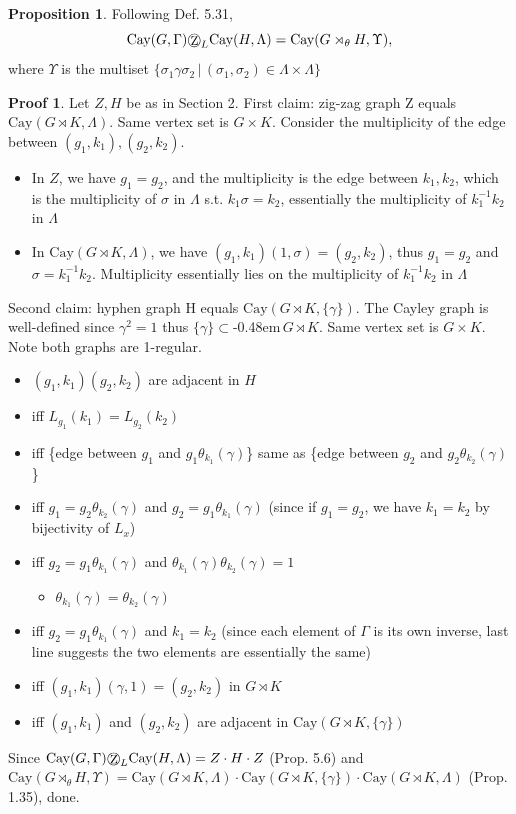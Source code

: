\documentclass{book}
\newcommand{\syin}{$\subset$\kern-0.48em\raisebox{.20ex}{\tiny S}$\,$}
\newcommand{\zigzag}{$\bigcirc$\kern-0.77em\raisebox{-.16ex}{\small Z}$\,$}
\newcommand{\Cay}[1]{\textrm{Cay}( #1 )}
\theoremstyle{definition}
\newtheorem{proposition}[lemma]{Proposition}
\theoremstyle{remarkstyle}
\newtheorem*{myproof}{Proof}%
\begin{document}
\begin{proposition}
Following Def. 5.31, 
    $$
    \Cay{G,\Gamma}\textrm{\zigzag}_L\Cay{H,\Lambda} = \Cay{G \rtimes_\theta H, \Upsilon}, 
    $$
    where $\Upsilon$ is the multiset $\{\sigma_1\gamma\sigma_2\,\lvert\,(\sigma_1,\sigma_2)\in \Lambda\times\Lambda\}$
\end{proposition}
\begin{myproof}
    Let $Z, H$ be as in Section 2. First claim: zig-zag graph Z equals $\Cay{G\rtimes K,\Lambda}$. Same vertex set is $G\times K$. Consider the multiplicity of the edge between $(g_1,k_1), (g_2,k_2)$. 
    \begin{itemize}
        \item In $Z$, we have $g_1=g_2$, and the multiplicity is the edge between $k_1,k_2$, which is the multiplicity of $\sigma$ in $\Lambda$ s.t. $k_1\sigma=k_2$, essentially the multiplicity of $k^{-1}_1k_2 $ in $\Lambda$
        \item In $\Cay{G\rtimes K,\Lambda}$, we have $(g_1,k_1)(1,\sigma)=(g_2,k_2)$, thus $g_1=g_2$ and $\sigma=k^{-1}_1k_2 $. Multiplicity essentially lies on the multiplicity of $k^{-1}_1k_2 $ in $\Lambda$
    \end{itemize}
    Second claim: hyphen graph H equals $\Cay{G\rtimes K, \{\gamma\}}$. The Cayley graph is well-defined since $\gamma^2=1$ thus $\{\gamma\}$\syin$G\rtimes K$. Same vertex set is $G\times K$. Note both graphs are 1-regular. 
    \begin{itemize}
        \item $(g_1,k_1)(g_2,k_2)$ are adjacent in $H$
        \item iff $L_{g_1}(k_1) = L_{g_2}(k_2) $
        \item iff \{edge between $g_1$ and $g_1\theta_{k_1}(\gamma)$\} same as \{edge between $g_2$ and $g_2\theta_{k_2}(\gamma)$\} 
        \item iff $g_1 = g_2\theta_{k_2}(\gamma) $ and $g_2 = g_1\theta_{k_1}(\gamma) $ (since if $g_1= g_2$, we have $k_1=k_2$ by bijectivity of $L_x$) 
        \item iff $g_2 = g_1\theta_{k_1}(\gamma) $ and $\theta_{k_1}(\gamma)\theta_{k_2}(\gamma)=1$
        \begin{itemize}
            \item $\theta_{k_1}(\gamma) = \theta_{k_2}(\gamma) $
        \end{itemize}
        \item iff $g_2 = g_1\theta_{k_1}(\gamma) $ and $k_1=k_2$ (since each element of $\Gamma$ is its own inverse, last line suggests the two elements are essentially the same)
        \item iff $(g_1,k_1)(\gamma,1)=(g_2,k_2)$ in $G\rtimes K$
        \item iff $(g_1,k_1)$ and $(g_2,k_2)$ are adjacent in $\Cay{G\rtimes K, \{\gamma\}}$
    \end{itemize}
    Since $\Cay{G,\Gamma}\textrm{\zigzag}_L\Cay{H,\Lambda} = Z\cdot H\cdot Z$ (Prop. 5.6) and $\Cay{G \rtimes_\theta H, \Upsilon} = \Cay{G\rtimes K,\Lambda} \cdot \Cay{G\rtimes K, \{\gamma\}} \cdot  \Cay{G\rtimes K,\Lambda} $ (Prop. 1.35), done. \newline
\end{myproof}
\end{document}
